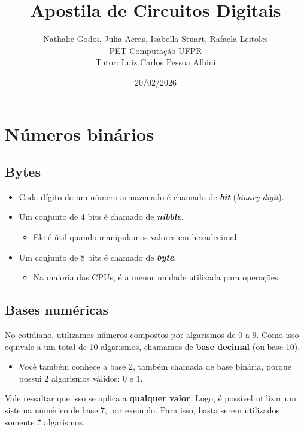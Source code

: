 \documentclass[12pt]{article}
\title{Apostila de Circuitos Digitais}
\author{%
    Nathalie Godoi, Julia Acras, Isabella Stuart, Rafaela Leitoles\\
    \vspace{0.2cm}
    \large PET Computação UFPR\\
    \large Tutor: Luiz Carlos Pessoa Albini
}
\date{20/02/2026}
\begin{document}
\maketitle

\tableofcontents
\clearpage

\section{Números binários}

\subsection{Bytes}
\begin{itemize}
    \item Cada dígito de um número armazenado é chamado de \textbf{\textit{bit}} (\textit{binary digit}).
    \item Um conjunto de 4 bits é chamado de \textbf{\textit{nibble}}.
    \begin{itemize}
        \item [""] Ele é útil quando manipulamos valores em hexadecimal.
    \end{itemize}
    \item Um conjunto de 8 bits é chamado de \textbf{\textit{byte}}.
    \begin{itemize}
        \item [""] Na maioria das CPUs, é a menor unidade utilizada para operações.
    \end{itemize}
\end{itemize}

\subsection{Bases numéricas}
No cotidiano, utilizamos números compostos por algarismos de 0 a 9. Como isso equivale a um total de 10 algarismos, chamamos de \textbf{base decimal} (ou base 10).
\begin{itemize}
    \item Você também conhece a base 2, também chamada de base binária, porque possui 2 algarismos válidos: 0 e 1.
\end{itemize}
Vale ressaltar que isso se aplica a \textbf{qualquer valor}. Logo, é possível utilizar um sistema numérico de base 7, por exemplo. Para isso, basta serem utilizados somente 7 algarismos.
\end{document}
